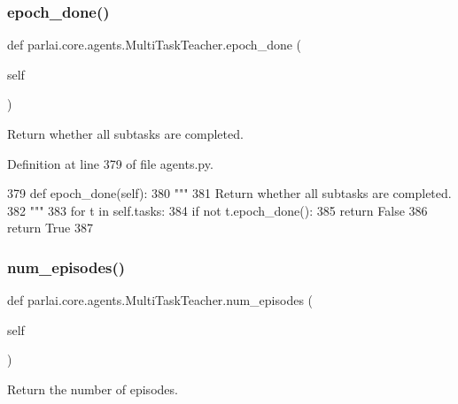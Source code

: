 \subsubsection{\texorpdfstring{epoch\+\_\+done()}{epoch\_done()}}
{\footnotesize\ttfamily def parlai.\+core.\+agents.\+Multi\+Task\+Teacher.\+epoch\+\_\+done (\begin{DoxyParamCaption}\item[{}]{self }\end{DoxyParamCaption})}

\begin{DoxyVerb}Return whether all subtasks are completed.
\end{DoxyVerb}
 

Definition at line 379 of file agents.\+py.


\begin{DoxyCode}
379     \textcolor{keyword}{def }epoch\_done(self):
380         \textcolor{stringliteral}{"""}
381 \textcolor{stringliteral}{        Return whether all subtasks are completed.}
382 \textcolor{stringliteral}{        """}
383         \textcolor{keywordflow}{for} t \textcolor{keywordflow}{in} self.tasks:
384             \textcolor{keywordflow}{if} \textcolor{keywordflow}{not} t.epoch\_done():
385                 \textcolor{keywordflow}{return} \textcolor{keyword}{False}
386         \textcolor{keywordflow}{return} \textcolor{keyword}{True}
387 
\end{DoxyCode}
\mbox{\label{classparlai_1_1core_1_1agents_1_1MultiTaskTeacher_ac292d1cb86a3769c352e2d3658f324d2}} 
\subsubsection{\texorpdfstring{num\+\_\+episodes()}{num\_episodes()}}
{\footnotesize\ttfamily def parlai.\+core.\+agents.\+Multi\+Task\+Teacher.\+num\+\_\+episodes (\begin{DoxyParamCaption}\item[{}]{self }\end{DoxyParamCaption})}

\begin{DoxyVerb}Return the number of episodes.
\end{DoxyVerb}
 

